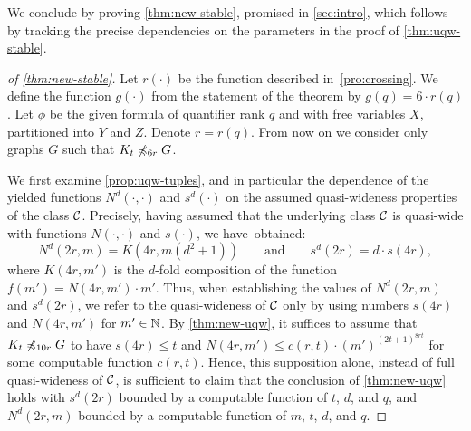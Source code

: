 


We conclude by proving \cref{thm:new-stable}, promised in \cref{sec:intro}, which follows by tracking the precise dependencies on the parameters in the proof of \cref{thm:uqw-stable}.

\begin{proof}[of \cref{thm:new-stable}]
  Let $r(\cdot)$ be the function described in~\cref{pro:crossing}. We 
  define the function $g(\cdot)$ from the statement of the theorem by $g(q)=6\cdot r(q)$.
	Let $\phi$ be the given formula of quantifier rank $q$ and with  free variables $X$, partitioned into $Y$ and $Z$.
  Denote $r=r(q)$. From now on we consider only graphs $G$ such that $K_t\not\preccurlyeq_{6r} G$.

We first examine \cref{prop:uqw-tuples}, and in particular the dependence of the yielded functions 
$N^d(\cdot,\cdot)$ and $s^d(\cdot)$ on the assumed quasi-wideness properties of the class $\mathcal{C}$.
Precisely, having assumed that the underlying class $\mathcal{C}$ is quasi-wide with functions $N(\cdot,\cdot)$ and $s(\cdot)$,
we have~obtained:
$$
N^d(2r,m)=K(4r,m(d^2+1))\qquad\textrm{and}\qquad s^d(2r)=d\cdot s(4r),
$$
where $K(4r,m')$ is the $d$-fold composition of the function $f(m')=N(4r,m')\cdot m'$.
Thus, when establishing the values of $N^d(2r,m)$ and $s^d(2r)$, we refer to the quasi-wideness of $\mathcal{C}$ only by using numbers $s(4r)$ and $N(4r,m')$ for $m'\in \mathbb{N}$.
By \cref{thm:new-uqw}, it suffices to assume that $K_t\not\preccurlyeq_{10r} G$ to have $s(4r)\leq t$ and $N(4r,m')\leq c(r,t)\cdot (m')^{(2t+1)^{8rt}}$ for some computable function $c(r,t)$.
Hence, this supposition alone, instead of full quasi-wideness of $\mathcal{C}$, is sufficient to claim that the conclusion of \cref{thm:new-uqw} holds with
$s^d(2r)$ bounded by a computable function of $t$, $d$, and $q$, and $N^d(2r,m)$ bounded by a computable function of $m$, $t$, $d$, and $q$.

	

\end{proof}
